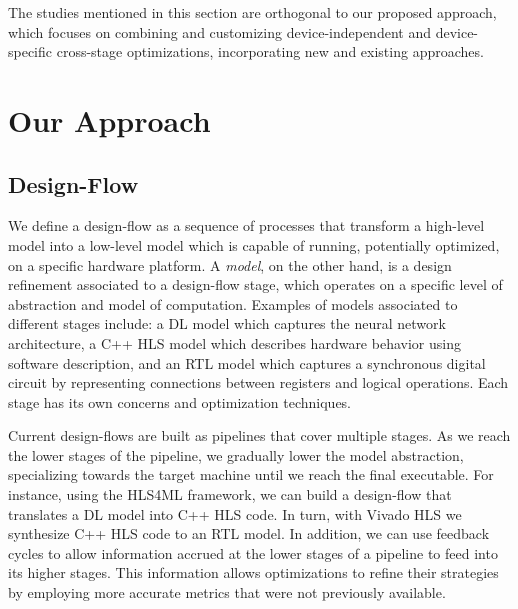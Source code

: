 The studies mentioned in this section are orthogonal to our proposed approach, which focuses on combining and customizing  device-independent and device-specific cross-stage optimizations, incorporating new and existing approaches. 



\section{Our Approach} \label{sec:approach}

\subsection{Design-Flow}

We define a design-flow as a sequence of processes that transform a high-level model into a low-level model which is capable of running, potentially optimized, on a specific hardware platform. A \textit{model}, on the other hand, is a design refinement associated to a design-flow stage, which operates on a specific level of abstraction and model of computation. Examples of models associated to different stages include: a DL model which captures the neural network architecture, a C++ HLS model which describes hardware behavior using software description, and an RTL model which captures a synchronous digital circuit by representing connections between registers and logical operations. Each stage has its own concerns and optimization techniques.

Current design-flows are built as pipelines that cover multiple stages. As we reach the lower stages of the pipeline, we gradually lower the model abstraction, specializing towards the target machine until we reach the final executable. For instance, using the HLS4ML framework, we can build a design-flow that translates a DL model into C++ HLS code. In turn, with Vivado HLS we synthesize C++ HLS code to an RTL model. In addition, we can use feedback cycles to allow information accrued at the lower stages of a pipeline to feed into its higher stages. This information allows optimizations to refine their strategies by employing more accurate metrics that were not previously available.

